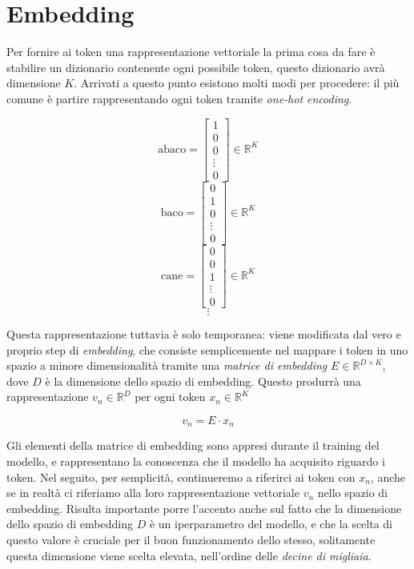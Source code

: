 \section{Embedding}

Per fornire ai token una rappresentazione vettoriale la prima cosa da fare è stabilire un dizionario contenente ogni possibile token, questo dizionario avrà dimensione \(K\). Arrivati a questo punto esistono molti modi per procedere: il più comune è partire rappresentando ogni token tramite \textit{one-hot encoding}.

\[
    \text{abaco} = \begin{bmatrix}1\\0\\0\\\vdots\\0\end{bmatrix} \in \mathbb{R}^K
\]
\[
    \text{baco} = \begin{bmatrix}0\\1\\0\\\vdots\\0\end{bmatrix} \in \mathbb{R}^K
\]
\[
    \text{cane} = \begin{bmatrix}0\\0\\1\\\vdots\\0\end{bmatrix} \in \mathbb{R}^K
\]
\[
    \vdots
\]

Questa rappresentazione tuttavia è solo temporanea: viene modificata dal vero e proprio step di \textit{embedding}, che consiste semplicemente nel mappare i token in uno spazio a minore dimensionalità tramite una \textit{matrice di embedding} \(E \in \mathbb{R}^{D \times K}\), dove \(D\) è la dimensione dello spazio di embedding. Questo produrrà una rappresentazione \(v_n \in \mathbb{R}^D\) per ogni token \(x_n \in \mathbb{R}^K\)

\begin{equation}
    v_n = E \cdot x_n
\end{equation}

Gli elementi della matrice di embedding sono appresi durante il training del modello, e rappresentano la conoscenza che il modello ha acquisito riguardo i token. Nel seguito, per semplicità, continueremo a riferirci ai token con \(x_n\), anche se in realtà ci riferiamo alla loro rappresentazione vettoriale \(v_n\) nello spazio di embedding. Risulta importante porre l'accento anche sul fatto che la dimensione dello spazio di embedding \(D\) è un iperparametro del modello, e che la scelta di questo valore è cruciale per il buon funzionamento dello stesso, solitamente questa dimensione viene scelta elevata, nell'ordine delle \textit{decine di migliaia}.

